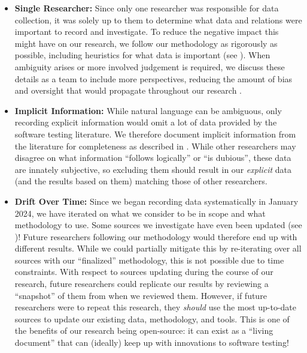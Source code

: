 \begin{itemize}
    \item \textbf{Single Researcher:} Since only one researcher was responsible
          for data collection, it was solely up to them to determine what data
          and relations were important to record and investigate. To reduce the
          negative impact this might have on our research, we follow our
          methodology as rigorously as possible, including heuristics
          for what data is important (see ). When ambiguity
          arises or more involved judgement is required, we discuss these
          details as a team to include more perspectives, reducing the amount
          of bias and oversight that would propagate throughout our research%
          .

    \item \textbf{Implicit Information:} While natural language can be
          ambiguous, only recording explicit information would omit a lot of
          data provided by the software testing literature. We therefore
          document implicit information from the
          literature for completeness as described in . While
          other researchers may disagree on what information ``follows
          logically'' or ``is dubious'', these data are innately subjective,
          so excluding them should result in our \emph{explicit} data (and
          the results based on them) matching those of other researchers.

    \item \textbf{Drift Over Time:} Since we began recording data
          systematically in January 2024, we have
          iterated on what we consider to be in scope and what methodology to
          use. Some sources we investigate have even been updated (see
          )! Future researchers following our methodology
          would therefore end up with different results. While we could
          partially mitigate this by re-iterating over all sources with our
          ``finalized'' methodology, this is not possible due to time
          constraints. With respect to sources updating during the course of
          our research, future researchers could replicate our results by
          reviewing a ``snapshot'' of them from when we reviewed them. However, if future
          researchers were to repeat this research, they \emph{should} use the
          most up-to-date sources to update our existing data, methodology, and
          tools. This is one of the benefits of our research being open-source:
          it can exist as a ``living document'' that can (ideally) keep up with
          innovations to software testing!
\end{itemize}

